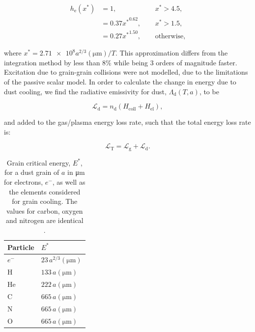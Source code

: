 \documentclass[fleqn,usenatbib]{mnras}
\newcommand{\rms}[1]{\ensuremath{_{\text{#1}}}}
\begin{document}
\begin{equation}
  \begin{alignedat}{3}
    h\rms{e}(x^*) & = 1 ,                && ~~ x^* > 4.5, \\
             & = 0.37{x^*}^{0.62} , && ~~ x^* > 1.5 , \\
             & = 0.27{x^*}^{1.50} , && ~~ \text{otherwise,}
  \end{alignedat}
\end{equation}

\noindent
where $x^* = \num{2.71e8} a^{2/3} (\si{\micro\metre})/T$.
This approximation differs from the integration method by less than 8\% while being 3 orders of magnitude faster.
Excitation due to grain-grain collisions were not modelled, due to the limitations of the passive scalar model.
In order to calculate the change in energy due to dust cooling, we find the radiative emissivity for dust, $\Lambda\rms{d}(T,a)$, to be

\begin{equation}
  \mathcal{L}\rms{d} = n_\text{d} (H\rms{coll} + H\rms{el}) ,
\end{equation}

\noindent
and added to the gas/plasma energy loss rate, such that the total energy loss rate is:

\begin{equation}
  \mathcal{L}\rms{T} = \mathcal{L}\rms{g} + \mathcal{L}\rms{d} .
\end{equation}

\begin{table}
  \centering
  \begin{tabular}{ll}
    \hline
    Particle & $E^*$ \\
    \hline
    $e^-$ & $23 \, a^{2/3}(\si{\micro\metre})$ \\
    H     & $133 \, a(\si{\micro\metre})$ \\
    He    & $222 \, a(\si{\micro\metre})$ \\
    C     & $665 \, a(\si{\micro\metre})$ \\
    N     & $665 \, a(\si{\micro\metre})$ \\
    O     & $665 \, a(\si{\micro\metre})$ \\
    \hline
  \end{tabular}
  \caption[Grain critical energy]{Grain critical energy, $E^*$, for a dust grain of $a$ in \si{\micro\metre} for electrons, $e^-$, as well as the elements considered for grain cooling. The values for carbon, oxygen and nitrogen are identical \citep{dwek_infrared_1981}.}
  \label{tab:p2-criticalenergy}
\end{table}
\end{document}
